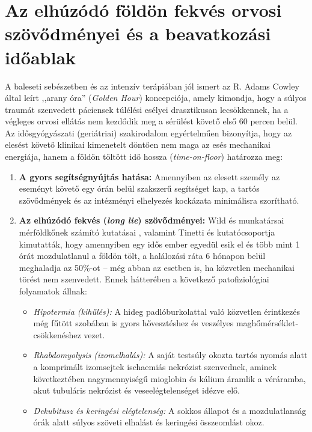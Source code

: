 \documentclass[12pt,a4paper,oneside]{report}
\begin{document}
\section{Az elhúzódó földön fekvés orvosi szövődményei és a beavatkozási időablak}
A baleseti sebészetben és az intenzív terápiában jól ismert az R. Adams Cowley által leírt ,,arany óra'' (\textit{Golden Hour}) koncepciója, amely kimondja, hogy a súlyos traumát szenvedett páciensek túlélési esélyei drasztikusan lecsökkennek, ha a végleges orvosi ellátás nem kezdődik meg a sérülést követő első 60 percen belül. Az idősgyógyászati (geriátriai) szakirodalom egyértelműen bizonyítja, hogy az elesést követő klinikai kimenetelt döntően nem maga az esés mechanikai energiája, hanem a földön töltött idő hossza (\textit{time-on-floor}) határozza meg:
\begin{enumerate}
    \item \textbf{A gyors segítségnyújtás hatása:} Amennyiben az elesett személy az eseményt követő egy órán belül szakszerű segítséget kap, a tartós szövődmények és az intézményi elhelyezés kockázata minimálisra szorítható.
    \item \textbf{Az elhúzódó fekvés (\textit{long lie}) szövődményei:} Wild és munkatársai mérföldkőnek számító kutatásai \cite{wild1981}, valamint Tinetti és kutatócsoportja \cite{tinetti1993} kimutatták, hogy amennyiben egy idős ember egyedül esik el és több mint 1 órát mozdulatlanul a földön tölt, a halálozási ráta 6 hónapon belül meghaladja az 50\%-ot -- még abban az esetben is, ha közvetlen mechanikai törést nem szenvedett. Ennek hátterében a következő patofiziológiai folyamatok állnak:
    \begin{itemize}
        \item \textit{Hipotermia (kihűlés):} A hideg padlóburkolattal való közvetlen érintkezés még fűtött szobában is gyors hővesztéshez és veszélyes maghőmérséklet-csökkenéshez vezet.
        \item \textit{Rhabdomyolysis (izomelhalás):} A saját testsúly okozta tartós nyomás alatt a komprimált izomsejtek ischaemiás nekrózist szenvednek, aminek következtében nagymennyiségű mioglobin és kálium áramlik a véráramba, akut tubuláris nekrózist és veseelégtelenséget idézve elő.
        \item \textit{Dekubitusz és keringési elégtelenség:} A sokkos állapot és a mozdulatlanság órák alatt súlyos szöveti elhalást és keringési összeomlást okoz.
    \end{itemize}
\end{enumerate}
\end{document}

